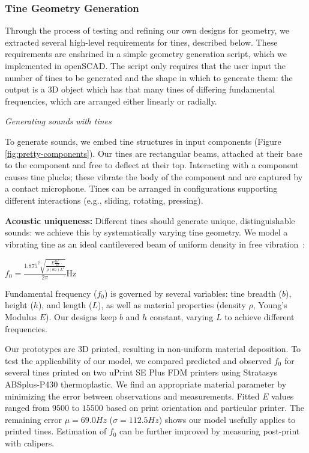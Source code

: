         \subsubsection{Tine Geometry Generation}
    
        Through the process of testing and refining our own designs for geometry, we extracted several high-level requirements for tines, described below. These requirements are enshrined in a simple geometry generation script, which we implemented in openSCAD. The script only requires that the user input the number of tines to be generated and the shape in which to generate them: the output is a 3D object which has that many tines of differing fundamental frequencies, which are arranged either linearly or radially. 
    
        \emph{Generating sounds with tines}

        To generate sounds, we embed tine structures in input components (Figure \ref{fig:pretty-components}). Our tines are rectangular beams, attached at their base to the component and free to deflect at their top. Interacting with a component causes tine plucks; these vibrate the body of the component and are captured by a contact microphone.
Tines can be arranged in configurations supporting different interactions (e.g., sliding, rotating, pressing).


            \textbf{Acoustic uniqueness:} Different tines should generate unique, distinguishable sounds: we achieve this by systematically varying tine geometry. We model a vibrating tine as an ideal cantilevered beam of uniform density in free vibration~\cite{Meirovitch-analytical}: 

            \begin{center}
             $f_0 = \frac{1.875^2 \sqrt{\frac{E\frac{bh^3}{12}}{\rho (bh)L^4}}}{2\pi}$Hz
            \end{center}

            Fundamental frequency ($f_0$) is governed by several variables: tine breadth ($b$), height ($h$), and length ($L$), as well as material properties (density $\rho$, Young's Modulus $E$). Our designs keep $b$ and $h$ constant, varying $L$ to achieve different frequencies.

            Our prototypes are 3D printed, resulting in non-uniform material deposition. To test the applicability of our model, we compared predicted and observed $f_0$ for several tines printed on two uPrint SE Plus FDM printers using Stratasys ABSplus-P430 thermoplastic. We find an appropriate material parameter by minimizing the error between observations and measurements. Fitted $E$ values ranged from $9500$ to $15500$ based on print orientation and particular printer.  The remaining error $\mu= 69.0Hz$ ($\sigma= 112.5Hz$) shows our model usefully applies to printed tines. Estimation of $f_0$ can be further improved by measuring post-print with calipers.

